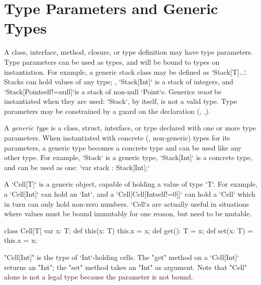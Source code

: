 \section{Type Parameters and Generic Types}
\label{TypeParameters}

\label{Generics}

A class, interface, method, closure, or type definition  may have type
parameters.  Type parameters can be used as types, and will be bound to types
on instantiation.  For example, a generic stack class may be defined as 
\xcd`Stack[T]{...}`.  Stacks can hold values of any type; \eg, 
\xcd`Stack[Int]` is a stack of integers, and 
\xcd`Stack[Point{self!=null}]`is a stack of non-null \xcd`Point`s.
Generics {\em must} be instantiated when they are used: \xcd`Stack`, by
itself, is not a valid type.
Type parameters may be constrained by a guard on the declaration
(,
,).

A {\em generic type} is a class, struct,  interface, or type declared with one or
more type parameters.  When instantiated with concrete (\viz, non-generic)
types for its parameters, a generic type becomes a concrete type and can be
used like any other type. For example,
\xcd`Stack` is a generic type, 
\xcd`Stack[Int]` is a concrete type, and can be used as one: 
\xcd`var stack : Stack[Int];`


A \xcd`Cell[T]` is a generic object, capable of holding a value of type
\xcd`T`.  For example, a \xcd`Cell[Int]` can hold an \xcd`Int`, and a
\xcd`Cell[Cell[Int{self!=0}]]` can hold a \xcd`Cell` which in turn can
only hold non-zero numbers.  \xcd`Cell`s are actually useful in situations
where values must be bound immutably for one reason, but need to be mutable.
\begin{xten}
class Cell[T] {
    var x: T;
    def this(x: T) { this.x = x; }
    def get(): T = x;
    def set(x: T) = { this.x = x; }
}
\end{xten}


\xcd"Cell[Int]" is the type of \xcd`Int`-holding cells.  
The \xcd"get" method on a \xcd`Cell[Int]` returns an \xcd"Int"; the
\xcd"set" method takes an \xcd"Int" as argument.  Note that
\xcd"Cell" alone is not a legal type because the parameter is
not bound.


